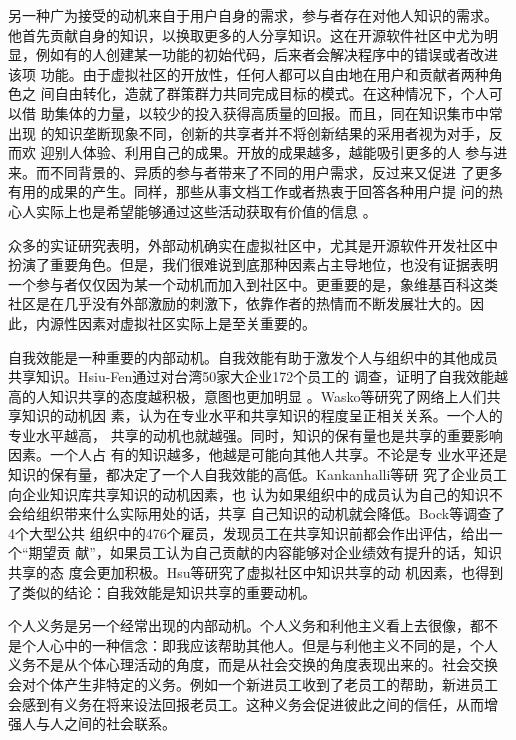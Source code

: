 \documentclass[12pt,a4paper,cs4size]{ctexart}
\begin{document}
另一种广为接受的动机来自于用户自身的需求，参与者存在对他人知识的需求。
他首先贡献自身的知识，以换取更多的人分享知识。这在开源软件社区中尤为明
显，例如有的人创建某一功能的初始代码，后来者会解决程序中的错误或者改进
该项
功能。由于虚拟社区的开放性，任何人都可以自由地在用户和贡献者两种角色之
间自由转化，造就了群策群力共同完成目标的模式。在这种情况下，个人可以借
助集体的力量，以较少的投入获得高质量的回报。而且，同在知识集市中常出现
的知识垄断现象不同，创新的共享者并不将创新结果的采用者视为对手，反而欢
迎别人体验、利用自己的成果。开放的成果越多，越能吸引更多的人
参与进来。而不同背景的、异质的参与者带来了不同的用户需求，反过来又促进
了更多有用的成果的产生。同样，那些从事文档工作或者热衷于回答各种用户提
问的热心人实际上也是希望能够通过这些活动获取有价值的信息
\cite{lakhani2003fos}。



众多的实证研究表明，外部动机确实在虚拟社区中，尤其是开源软件开发社区中
扮演了重要角色。但是，我们很难说到底那种因素占主导地位，也没有证据表明
一个参与者仅仅因为某一个动机而加入到社区中。更重要的是，象维基百科这类
社区是在几乎没有外部激励的刺激下，依靠作者的热情而不断发展壮大的。因
此，内源性因素对虚拟社区实际上是至关重要的。

自我效能是一种重要的内部动机。自我效能有助于激发个人与组织中的其他成员
共享知识。Hsiu-Fen通过对台湾50家大企业172个员工的
调查，证明了自我效能越高的人知识共享的态度越积极，意图也更加明显
\cite{Hsiu-FenLin04012007}。Wasko等研究了网络上人们共享知识的动机因
素，认为在专业水平和共享知识的程度呈正相关关系。一个人的专业水平越高，
共享的动机也就越强。同时，知识的保有量也是共享的重要影响因素。一个人占
有的知识越多，他越是可能向其他人共享\cite{1631335820050301}。不论是专
业水平还是知识的保有量，都决定了一个人自我效能的高低。Kankanhalli等研
究了企业员工向企业知识库共享知识的动机因素，也
认为如果组织中的成员认为自己的知识不会给组织带来什么实际用处的话，共享
自己知识的动机就会降低\cite{1631337020050301}。Bock等调查了4个大型公共
组织中的476个雇员，发现员工在共享知识前都会作出评估，给出一个“期望贡
献”，如果员工认为自己贡献的内容能够对企业绩效有提升的话，知识共享的态
度会更加积极\cite{631757820020401}。Hsu等研究了虚拟社区中知识共享的动
机因素，也得到了类似的结论：自我效能是知识共享的重要动机\cite{Hsu2007}。

个人义务是另一个经常出现的内部动机。个人义务和利他主义看上去很像，都不
是个人心中的一种信念：即我应该帮助其他人。但是与利他主义不同的是，个人
义务不是从个体心理活动的角度，而是从社会交换的角度表现出来的。社会交换
会对个体产生非特定的义务。例如一个新进员工收到了老员工的帮助，新进员工
会感到有义务在将来设法回报老员工。这种义务会促进彼此之间的信任，从而增
强人与人之间的社会联系\cite{gouldner1960nrp}。
\end{document}
